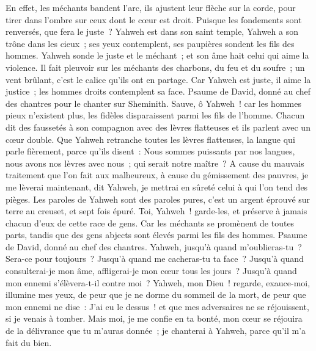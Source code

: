 \begin{multicols}{2}
En effet, les méchants bandent l'arc, ils ajustent leur flèche sur la corde, pour tirer dans l'ombre sur ceux dont le cœur est droit.
Puisque les fondements sont renversés, que fera le juste~?
Yahweh est dans son saint temple, Yahweh a son trône dans les cieux~; ses yeux contemplent, ses paupières sondent les fils des hommes.
Yahweh sonde le juste et le méchant~; et son âme hait celui qui aime la violence.
Il fait pleuvoir sur les méchants des charbons, du feu et du soufre~; un vent brûlant, c'est le calice qu'ils ont en partage.
Car Yahweh est juste, il aime la justice~; les hommes droits contemplent sa face.
\VerseOne{}Psaume de David, donné au chef des chantres pour le chanter sur Sheminith.
Sauve, ô Yahweh~! car les hommes pieux n'existent plus, les fidèles disparaissent parmi les fils de l'homme.
Chacun dit des faussetés à son compagnon avec des lèvres flatteuses et ils parlent avec un cœur double.
Que Yahweh retranche toutes les lèvres flatteuses, la langue qui parle fièrement,
parce qu'ils disent~: Nous sommes puissants par nos langues, nous avons nos lèvres avec nous~; qui serait notre maître~?
A cause du mauvais traitement que l'on fait aux malheureux, à cause du gémissement des pauvres, je me lèverai maintenant, dit Yahweh, je mettrai en sûreté celui à qui l'on tend des pièges.
Les paroles de Yahweh sont des paroles pures, c'est un argent éprouvé sur terre au creuset, et sept fois épuré.
Toi, Yahweh~! garde-les, et préserve à jamais chacun d'eux de cette race de gens.
Car les méchants se promènent de toutes parts, tandis que des gens abjects sont élevés parmi les fils des hommes.
\VerseOne{}Psaume de David, donné au chef des chantres.
Yahweh, jusqu'à quand m'oublieras-tu~? Sera-ce pour toujours~? Jusqu'à quand me cacheras-tu ta face~?
Jusqu'à quand consulterai-je mon âme, affligerai-je mon cœur tous les jours~? Jusqu'à quand mon ennemi s'élèvera-t-il contre moi~?
Yahweh, mon Dieu~! regarde, exauce-moi, illumine mes yeux, de peur que je ne dorme du sommeil de la mort,
de peur que mon ennemi ne dise~: J'ai eu le dessus~! et que mes adversaires ne se réjouissent, si je venais à tomber.
Mais moi, je me confie en ta bonté, mon cœur se réjouira de la délivrance que tu m'auras donnée~; je chanterai à Yahweh, parce qu'il m'a fait du bien.

\end{multicols}
